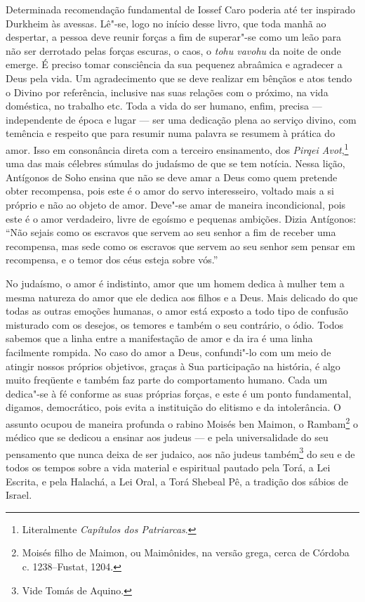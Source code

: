 Determinada recomendação fundamental de Iossef Caro poderia até ter
inspirado Durkheim às avessas. Lê"-se, logo no início desse livro, que
toda manhã ao despertar, a pessoa deve reunir forças a fim de superar"-se
como um leão para não ser derrotado pelas forças escuras, o caos, o
\emph{tohu vavohu} da noite de onde emerge. É preciso tomar consciência
da sua pequenez abraâmica e agradecer a Deus pela vida. Um agradecimento
que se deve realizar em bênçãos e atos tendo o Divino por referência,
inclusive nas suas relações com o próximo, na vida doméstica, no
trabalho etc. Toda a vida do ser humano, enfim, precisa --- independente
de época e lugar --- ser uma dedicação plena ao serviço divino, com
temência e respeito que para resumir numa palavra se resumem à prática
do amor. Isso em consonância direta com a terceiro ensinamento, dos
\emph{Pirqei Avot},\footnote{Literalmente \emph{Capítulos dos Patriarcas}.} uma das mais célebres
súmulas do judaísmo de que se tem notícia. Nessa lição, Antígonos de
Soho ensina que não se deve amar a Deus como quem pretende obter
recompensa, pois este é o amor do servo interesseiro, voltado mais a si
próprio e não ao objeto de amor. Deve"-se amar de maneira incondicional,
pois este é o amor verdadeiro, livre de egoísmo e pequenas ambições.
Dizia Antígonos: ``Não sejais como os escravos que servem ao seu senhor
a fim de receber uma recompensa, mas sede como os escravos que servem ao
seu senhor sem pensar em recompensa, e o temor dos céus esteja sobre
vós.''

\asterisc

No judaísmo, o amor é indistinto, amor que um homem dedica à mulher tem
a mesma natureza do amor que ele dedica aos filhos e a Deus. Mais
delicado do que todas as outras emoções humanas, o amor está exposto a
todo tipo de confusão misturado com os desejos, os temores e também o
seu contrário, o ódio. Todos sabemos que a linha entre a manifestação de
amor e da ira é uma linha facilmente rompida. No caso do amor a Deus,
confundi"-lo com um meio de atingir nossos próprios objetivos, graças à
Sua participação na história, é algo muito freqüente e também faz parte
do comportamento humano. Cada um dedica"-se à fé conforme as suas
próprias forças, e este é um ponto fundamental, digamos, democrático,
pois evita a instituição do elitismo e da intolerância. O assunto ocupou
de maneira profunda o rabino Moisés ben Maimon, o Rambam\footnote{Moisés filho de Maimon, ou Maimônides, na versão grega, cerca de Córdoba c. 1238--Fustat, 1204.} o médico que se dedicou a ensinar aos judeus
--- e pela universalidade do seu pensamento que nunca deixa de ser
judaico, aos não judeus também\footnote{Vide Tomás de Aquino.} do seu e de todos
os tempos sobre a vida material e espiritual pautado pela Torá, a Lei
Escrita, e pela Halachá, a Lei Oral, a Torá Shebeal Pê, a tradição dos
sábios de Israel.

